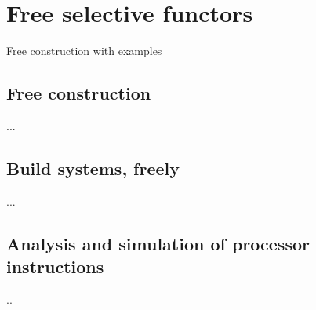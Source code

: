 \section{Free selective functors}\label{sec-free}

Free construction with examples

\subsection{Free construction}\label{sec-free-construction}

...

\subsection{Build systems, freely}

...

\subsection{Analysis and simulation of processor instructions}

..

